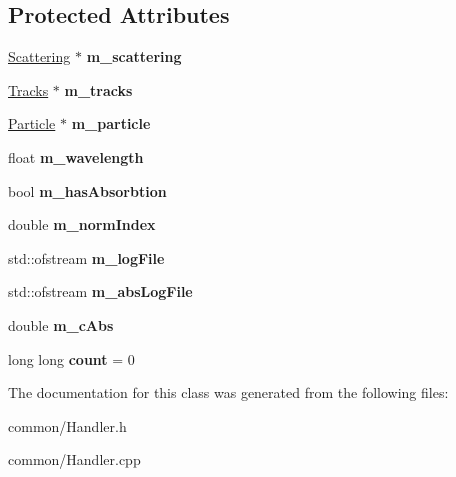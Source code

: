 \subsection*{Protected Attributes}
\begin{DoxyCompactItemize}
\item 
\mbox{\label{class_handler_a3ec723e931c7e29d4c170b5952019992}} 
\mbox{\hyperlink{class_scattering}{Scattering}} $\ast$ {\bfseries m\+\_\+scattering}
\item 
\mbox{\label{class_handler_a6125e2561ea3f9f075c03df319c0c97e}} 
\mbox{\hyperlink{class_tracks}{Tracks}} $\ast$ {\bfseries m\+\_\+tracks}
\item 
\mbox{\label{class_handler_a0df3d2d833e7fda44787d65f81742ebd}} 
\mbox{\hyperlink{class_particle}{Particle}} $\ast$ {\bfseries m\+\_\+particle}
\item 
\mbox{\label{class_handler_af080b55b8049e366b2f2936a72dfda98}} 
float {\bfseries m\+\_\+wavelength}
\item 
\mbox{\label{class_handler_a9ae74da04772426e9d0cf7769f37feff}} 
bool {\bfseries m\+\_\+has\+Absorbtion}
\item 
\mbox{\label{class_handler_a6ea64506e8b2aba07964693d37ab9193}} 
double {\bfseries m\+\_\+norm\+Index}
\item 
\mbox{\label{class_handler_a47907a97893becf7a1a57b8aeaf90a9e}} 
std\+::ofstream {\bfseries m\+\_\+log\+File}
\item 
\mbox{\label{class_handler_a0f06b8309569959b37669991045b8b1d}} 
std\+::ofstream {\bfseries m\+\_\+abs\+Log\+File}
\item 
\mbox{\label{class_handler_ad9af0b7001559831a5abed09014d11d0}} 
double {\bfseries m\+\_\+c\+Abs}
\item 
\mbox{\label{class_handler_a5de093fc5bccc1d7aa3f60059408c7bc}} 
long long {\bfseries count} = 0
\end{DoxyCompactItemize}


The documentation for this class was generated from the following files\+:\begin{DoxyCompactItemize}
\item 
common/Handler.\+h\item 
common/Handler.\+cpp\end{DoxyCompactItemize}
